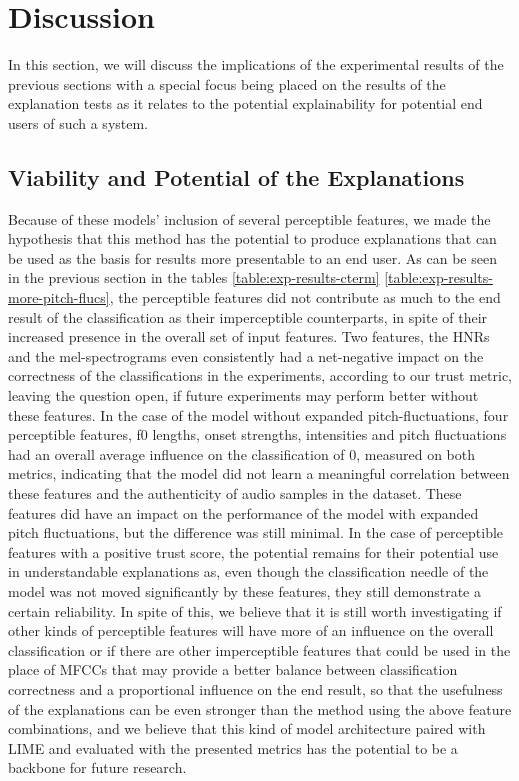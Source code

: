 \documentclass{article}
\begin{document}
	\section{Discussion}
	\label{sec:discussion}
	In this section, we will discuss the implications of the experimental results of the previous
	sections with a special focus being placed on the results of the explanation tests as it
	relates to the potential explainability for potential end users of such a system.
		\subsection{Viability and Potential of the Explanations}
		Because of these models' inclusion of several perceptible features, we made the hypothesis
		that this method has the potential to produce explanations that can be used as the basis
		for results more presentable to an end user. As can be seen in the previous section in
		the tables \ref{table:exp-results-cterm} \ref{table:exp-results-more-pitch-flucs}, the
		perceptible features did not contribute as much to the end result of the classification as
		their imperceptible counterparts, in spite of their increased presence in the overall set
		of input features. Two features, the HNRs and the mel-spectrograms even consistently had a
		net-negative impact on the correctness of the classifications in the experiments,
		according to our trust metric, leaving the question open, if future experiments may
		perform better without these features. In the case of the model without expanded
		pitch-fluctuations, four perceptible features, f0 lengths, onset strengths, intensities
		and pitch fluctuations had an overall average influence on the classification of 0,
		measured on both metrics, indicating that the model did not learn a meaningful correlation
		between these features and the authenticity of audio samples in the dataset. These
		features did have an impact on the performance of the model with expanded pitch
		fluctuations, but the difference was still minimal. In the case of perceptible features
		with a positive trust score, the potential remains for their potential use in
		understandable explanations as, even though the classification needle of the model was not
		moved significantly by these features, they still demonstrate a certain reliability. In
		spite of this, we believe that it is still worth investigating if other kinds of
		perceptible features will have more of an influence on the overall classification or if
		there are other imperceptible features that could be used in the place of MFCCs that may
		provide a better balance between classification correctness and a proportional influence
		on the end result, so that the usefulness of the explanations can be even stronger than
		the method using the above feature combinations, and we believe that this kind of model
		architecture paired with LIME and evaluated with the presented metrics has the potential
		to be a backbone for future research.
\end{document}
